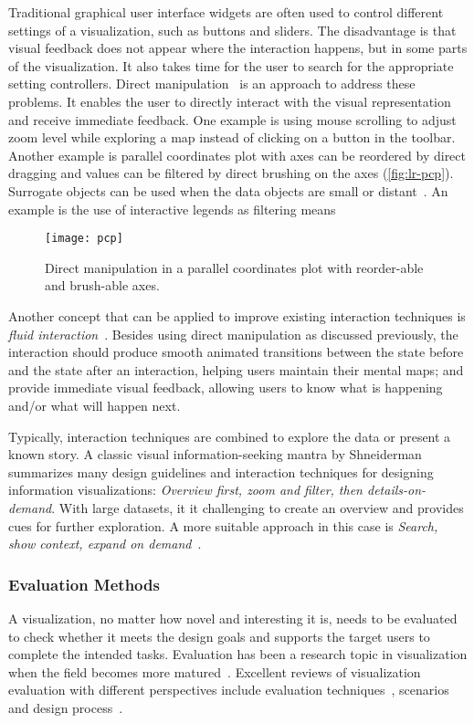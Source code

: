 Traditional graphical user interface widgets are often used to control different settings of a visualization, such as buttons and sliders. The disadvantage is that visual feedback does not appear where the interaction happens, but in some parts of the visualization. It also takes time for the user to search for the appropriate setting controllers. Direct manipulation~\cite{Shneiderman1982} is an approach to address these problems. It enables the user to directly interact with the visual representation and receive immediate feedback. One example is using mouse scrolling to adjust zoom level while exploring a map instead of clicking on a button in the toolbar. Another example is parallel coordinates plot with axes can be reordered by direct dragging and values can be filtered by direct brushing on the axes (\autoref{fig:lr-pcp}). Surrogate objects can be used when the data objects are small or distant~\cite{Kwon2011}. An example is the use of interactive legends as filtering means~\cite{Riche2010b}

\begin{figure}[!htb]
	\centering
	\texttt{[image: pcp]}
	\caption{Direct manipulation in a parallel coordinates plot with reorder-able and brush-able axes.}
	\label{fig:lr-pcp}
\end{figure}

Another concept that can be applied to improve existing interaction techniques is \emph{fluid interaction}~\cite{Elmqvist2011}. Besides using direct manipulation as discussed previously, the interaction should produce smooth animated transitions between the state before and the state after an interaction, helping users maintain their mental maps; and provide immediate visual feedback, allowing users to know what is happening and/or what will happen next.

Typically, interaction techniques are combined to explore the data or present a known story. A classic visual information-seeking mantra by Shneiderman~\cite{Shneiderman1996} summarizes many design guidelines and interaction techniques for designing information visualizations: \emph{Overview first, zoom and filter, then details-on-demand}. With large datasets, it it challenging to create an overview and provides cues for further exploration. A more suitable approach in this case is \emph{Search, show context, expand on demand}~\cite{VanHam2009}.

\subsubsection{Evaluation Methods}
A visualization, no matter how novel and interesting it is, needs to be evaluated to check whether it meets the design goals and supports the target users to complete the intended tasks. Evaluation has been a research topic in visualization when the field becomes more matured~\cite{Plaisant2004}. Excellent reviews of visualization evaluation with different perspectives include evaluation techniques~\cite{Carpendale2008}, scenarios~\cite{Lam2012} and design process~\cite{Munroe2009}.

